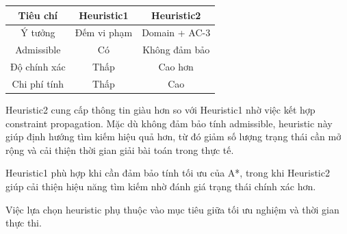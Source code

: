\begin{center}
\begin{tabular}{|c|c|c|}
\hline
Tiêu chí & Heuristic1 & Heuristic2 \\
\hline
Ý tưởng & Đếm vi phạm & Domain + AC-3 \\
Admissible & Có & Không đảm bảo \\
Độ chính xác & Thấp & Cao hơn \\
Chi phí tính & Thấp & Cao \\
\hline
\end{tabular}
\end{center}

Heuristic2 cung cấp thông tin giàu hơn so với Heuristic1 nhờ việc kết hợp constraint propagation. Mặc dù không đảm bảo tính admissible, heuristic này giúp định hướng tìm kiếm hiệu quả hơn, từ đó giảm số lượng trạng thái cần mở rộng và cải thiện thời gian giải bài toán trong thực tế.

Heuristic1 phù hợp khi cần đảm bảo tính tối ưu của A*, trong khi Heuristic2 giúp cải thiện hiệu năng tìm kiếm nhờ đánh giá trạng thái chính xác hơn.

Việc lựa chọn heuristic phụ thuộc vào mục tiêu giữa tối ưu nghiệm và thời gian thực thi.